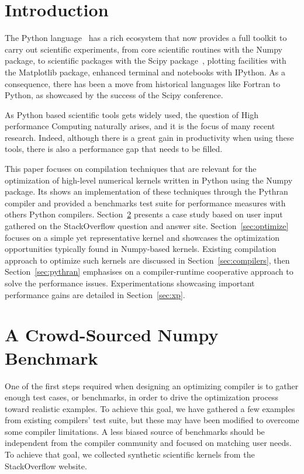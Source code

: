 \documentclass[10pt, preprint]{sigplanconf}
\begin{document}
\section{Introduction}

The Python language~\cite{rossum97} has a rich ecosystem that now provides a
full toolkit to carry out scientific experiments, from core scientific routines
with the Numpy package\cite{oliphant2007,numpyarray2011}, to scientific
packages with the Scipy package~\cite{scipy}, plotting facilities with the
Matplotlib package, enhanced terminal and notebooks with IPython. As a
consequence, there has been a move from historical languages like Fortran to
Python, as showcased by the success of the Scipy conference.

As Python based scientific tools gets widely used, the question of High
performance Computing naturally arises, and it is the focus of many recent
research. Indeed, although there is a great gain in productivity when using
these tools, there is also a performance gap that needs to be filled.

This paper focuses on compilation techniques that are relevant for the
optimization of high-level numerical kernels written in Python using the Numpy
package. Its shows an implementation of these techniques through the Pythran
compiler and provided a benchmarks test suite for performance measures with
others Python compilers.
Section~\ref{sec:stackoverflow} presents a case study based on user
input gathered on the StackOverflow question and answer site.
Section~\ref{sec:optimize} focuses on a simple yet representative kernel and
showcases the optimization opportunities typically found in Numpy-based
kernels. Existing compilation approach to optimize such kernels are discussed
in Section~\ref{sec:compilers}, then Section~\ref{sec:pythran} emphasises on a
compiler-runtime cooperative approach to solve the performance issues.
Experimentations showcasing important performance gains are detailed in
Section~\ref{sec:xp}.


\section{A Crowd-Sourced Numpy Benchmark}
\label{sec:stackoverflow}

One of the first steps required when designing an optimizing compiler is to
gather enough test cases, or benchmarks, in order to drive the optimization
process toward realistic examples. To achieve this goal, we have gathered a few
examples from existing compilers' test suite, but these may have been modified to
overcome some compiler limitations. A less biased source of benchmarks should
be independent from the compiler community and focused on matching user needs.
To achieve that goal, we collected synthetic scientific kernels from the
StackOverflow website.
\end{document}
